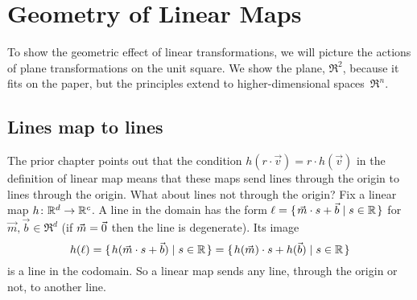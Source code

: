 \chapter{Geometry of Linear Maps}

To show the geometric effect of linear transformations, 
we will picture the actions 
of plane transformations on the unit square.
We show the plane, $\Re^2$, 
because it fits on the paper, but the principles extend to 
higher-dimensional spaces~$\Re^n$.




\section{Lines map to lines}
The prior chapter points out that 
the condition $h(r\cdot \vec{v})=r\cdot h(\vec{v})$ in the definition
of linear map means that
these maps send lines through the origin to lines through the origin.
What about lines not through the origin?
Fix a linear map $\mbox{$h\colon \mathbb{R}^d\to \mathbb{R}^c$}$.
A line in the domain has the form 
$\ell = \mbox{$\{\hspace{0.1em}\vec{m}\cdot s +\vec{b}\mid s\in\mathbb{R}\hspace{0.1em}\}$}$
for~$\vec{m}, \vec{b}\in\Re^d$ (if $\vec{m}=\vec{0}$ then the line is degenerate).
Its image
\begin{equation*}
  h(\ell)=\mbox{$\{\hspace{0.1em}h(\vec{m}\cdot s+\vec{b})\mid s\in\mathbb{R}\hspace{0.1em}\}$}
  =\mbox{$\{\hspace{0.1em}h(\vec{m})\cdot s+h(\vec{b})\mid s\in\mathbb{R}\hspace{0.1em}\}$}
\end{equation*}
is a line in the codomain.
So a linear map sends any line, through the origin or not, to another line.

